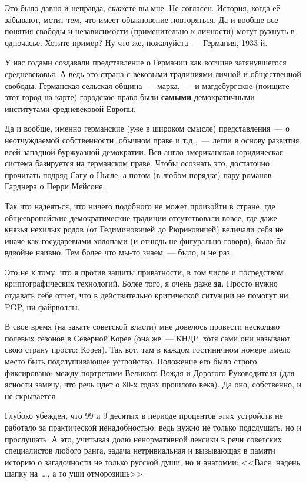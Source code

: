 Это было давно и неправда, скажете вы мне. Не согласен. История, когда её забывают, мстит тем, что имеет обыкновение повторяться. Да и вообще все понятия свободы и независимости (применительно к личности) могут рухнуть в одночасье. Хотите пример? Ну что же, пожалуйста~--- Германия, 1933-й.

У нас годами создавали представление о Германии как вотчине затянувшегося средневековья. А ведь это страна с вековыми традициями личной и общественной свободы. Германская сельская община~--- марка,~--- и магдебургское (поищите этот город на карте) городское право были \textbf{самыми} демократичными институтами средневековой Европы.

Да и вообще, именно германские (уже в широком смысле) представления~--- о неотчуждаемой собственности, обычном праве и т.д.,~--- легли в основу развития всей западной буржуазной демократии. Вся англо-американская юридическая система базируется на германском праве. Чтобы осознать это, достаточно прочитать подряд Сагу о Ньяле, а потом (в любом порядке) пару романов Гарднера о Перри Мейсоне.

Так что надеяться, что ничего подобного не может произойти в стране, где общеевропейские демократические традиции отсутствовали вовсе, где даже князья нехилых родов (от Гедиминовичей до Рюриковичей) величали себя не иначе как государевыми холопами (и отнюдь не фигурально говоря), было бы вдвойне наивно. Тем более что мы-то знаем~--- было, и не раз.

Это не к тому, что я против защиты приватности, в том числе и посредством криптографических технологий. Более того, я очень даже 
\textbf{за}. Просто нужно отдавать себе отчет, что в действительно критической ситуации не помогут ни PGP, ни файрволлы.

В свое время (на закате советской власти) мне довелось провести несколько полевых сезонов в Северной Корее (она же~--- КНДР, хотя сами они называют свою страну просто: Корея). Так вот, там в каждом гостиничном номере имело место быть подслушивающее устройство. Положение его было строго фиксировано: между портретами Великого Вождя и Дорогого Руководителя (для ясности замечу, что речь идет о 80-х годах прошлого века). Да оно, собственно, и не скрывается.

Глубоко убежден, что 99 и 9 десятых в периоде процентов этих устройств не работало за практической ненадобностью: ведь нужно не только подслушать, но и прослушать. А это, учитывая долю ненормативной лексики в речи советских специалистов любого ранга, задача нетривиальная и вызывающая в памяти историю о загадочности не только русской души, но и анатомии: <<Вася, надень шапку на~\dots, а то уши отморозишь>>.

